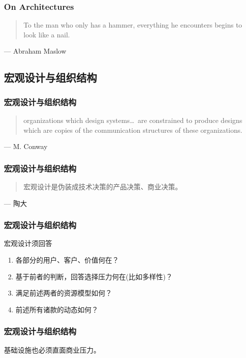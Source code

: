 \documentclass[UTF8,lualatex]{ctexbeamer}
\newcommand{\pagequote}[2]{
  \Large
  \begin{quotation}
      #1
  \end{quotation}
  \flushright\normalsize --- {#2}
}
\begin{document}
\begin{frame}
    \frametitle{On Architectures}
    \pagequote{To the man who only has a hammer, everything he encounters begins to look like a nail.}{Abraham Maslow}
\end{frame}

\subsection{宏观设计与组织结构}

\begin{frame}
    \frametitle{宏观设计与组织结构}
    \pagequote{
        organizations which design systems\ldots~are constrained to produce designs
        which are copies of the communication structures of these organizations.}
        {M. Conway}
\end{frame}

\begin{frame}
    \frametitle{宏观设计与组织结构}
    \pagequote{宏观设计是伪装成技术决策的产品决策、商业决策。}{陶大}
\end{frame}

\begin{frame}
    \frametitle{宏观设计与组织结构}
    \begin{block}{宏观设计须回答}
        \begin{enumerate}
            \item 各部分的用户、客户、价值何在？
            \item 基于前者的判断，回答选择压力何在(比如多样性)？
            \item 满足前述两者的资源模型如何？
            \item 前述所有诸款的动态如何？
        \end{enumerate}
    \end{block}
\end{frame}

\begin{frame}
    \frametitle{宏观设计与组织结构}
    \begin{corollary}
        基础设施也必须直面商业压力。
    \end{corollary}
\end{frame}
\end{document}
